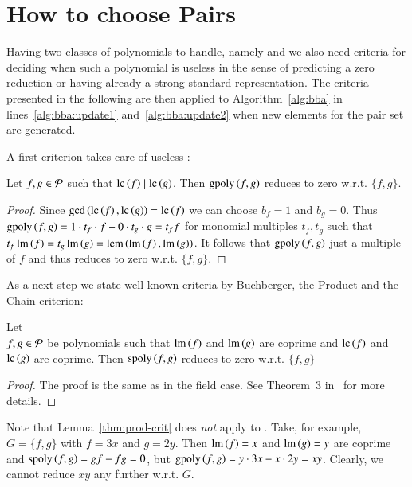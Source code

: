 \section{How to choose Pairs}
\label{sec:pairs}
Having two classes of polynomials to handle, namely \spts and \gpts we also need
criteria for deciding when such a polynomial is useless in the sense of
predicting a zero reduction or having already a strong standard representation.
The criteria presented in the following are then applied to
Algorithm~\ref{alg:bba} in lines~\ref{alg:bba:update1} and~\ref{alg:bba:update2}
when new elements for the pair set are generated.

A first criterion takes care of useless \gpts:

\begin{lemma}
Let $f,g \in \mathcal{P}$ such that $\mathrm{lc}\left({f}\right) \mid \mathrm{lc}\left({g}\right)$. Then $\mathrm{gpoly}\left({f},{g}\right)$ reduces
to zero w.r.t. $\{f,g\}$.
\label{crit:gpoly-easy}
\end{lemma}

\begin{proof}
Since $\gcd\left(\mathrm{lc}\left({f}\right), \mathrm{lc}\left({g}\right)\right) = \mathrm{lc}\left({f}\right)$ we can choose $b_f = 1$ and $b_g
=0$. Thus $\mathrm{gpoly}\left({f},{g}\right) = 1 \cdot t_f \cdot f - 0 \cdot t_g \cdot g = t_f f$ for monomial
multiples $t_f, t_g$ such that $t_f \operatorname{lm}\left({f}\right) = t_g \operatorname{lm}\left({g}\right) = \operatorname{lcm}\left(\operatorname{lm}\left({f}\right), \operatorname{lm}\left({g}\right)\right)$. It follows that $\mathrm{gpoly}\left({f},{g}\right)$ just a multiple of $f$ and
thus reduces to zero w.r.t. $\{f,g\}$.
\end{proof}

As a next step we state well-known criteria by Buchberger, the Product and the
Chain criterion:

\begin{lemma}
Let\\
$f,g \in \mathcal{P}$ be polynomials such that $\operatorname{lm}\left({f}\right)$ and $\operatorname{lm}\left({g}\right)$ are coprime and $\mathrm{lc}\left({f}\right)$ and $\mathrm{lc}\left({g}\right)$ are coprime.
Then $\mathrm{spoly}\left({f},{g}\right)$ reduces to zero w.r.t. $\{f,g\}$
\label{thm:prod-crit}
\end{lemma}

\begin{proof}
The proof is the same as in the field case.
See Theorem~3 in~\cite{lichtblau2012} for more details.
\end{proof}

Note that Lemma~\ref{thm:prod-crit} does \emph{not} apply to \gpts. Take, for
example, $G=\{f,g\}$ with $f=3x$ and $g=2y$. Then $\operatorname{lm}\left({f}\right) = x$ and $\operatorname{lm}\left({g}\right) = y$
are coprime and $\mathrm{spoly}\left({f},{g}\right) = g f - fg = 0$, but $\mathrm{gpoly}\left({f},{g}\right) = y \cdot 3x - x
\cdot 2y = xy$. Clearly, we cannot reduce $xy$ any further w.r.t. $G$.

